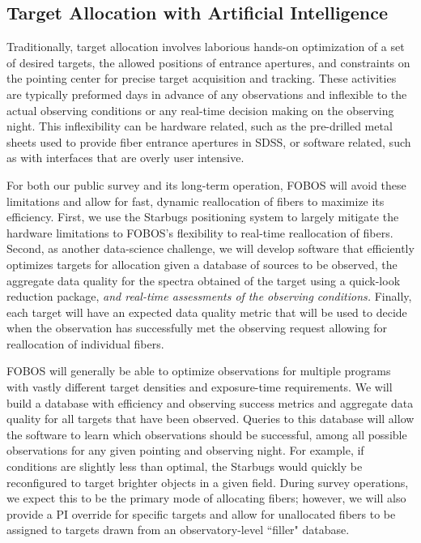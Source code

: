 \documentclass[oneside,11pt]{amsart}
\newcommand{\comment}[2][todo]{{\color{#1}[[{\bf #2}]]}}
\newcounter{chalno}
\newcommand{\chal}[1]{\refstepcounter{chalno}\label{#1}}
\begin{document}


\subsection{Target Allocation with Artificial Intelligence}
\label{sec:targeting}

Traditionally, target allocation involves laborious hands-on
optimization of a set of desired targets, the allowed positions of
entrance apertures, and constraints on the pointing center for precise
target acquisition and tracking.  These activities are typically
preformed days in advance of any observations and inflexible to the
actual observing conditions or any real-time decision making on the
observing night.  This inflexibility can be hardware related, such as
the pre-drilled metal sheets used to provide fiber entrance apertures in
SDSS, or software related, such as with interfaces that are overly user
intensive.

For both our public survey and its long-term operation, FOBOS will avoid
these limitations and allow for fast, dynamic reallocation of fibers to
maximize its efficiency.  First, we use the Starbugs positioning system
to largely mitigate the hardware limitations to FOBOS's flexibility to
real-time reallocation of fibers.  Second, as another data-science
challenge, we will develop software that efficiently optimizes targets
for allocation given a database of sources to be observed, the aggregate
data quality for the spectra obtained of the target using a quick-look
reduction package, {\it and real-time assessments of the observing
conditions.}  Finally, each target will have an expected data quality
metric that will be used to decide when the observation has successfully
met the observing request allowing for reallocation of individual
fibers.

\medskip \chal{target}   FOBOS will generally be able to optimize observations for
multiple programs with vastly different target densities and
exposure-time requirements.  We will build a database with efficiency
and observing success metrics and aggregate data quality for all targets
that have been observed.  Queries to this database will allow the
software to learn which observations should be successful, among all
possible observations for any given pointing and observing night.  For
example, if conditions are slightly less than optimal, the Starbugs
would quickly be reconfigured to target brighter objects in a given
field.  During survey operations, we expect this to be the primary mode
of allocating fibers; however, we will also provide a PI override for
specific targets and allow for unallocated fibers to be assigned to
targets drawn from an observatory-level ``filler" database.
\end{document}

